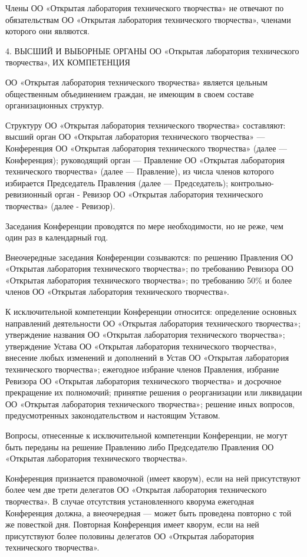\documentclass[a4paper,14pt,titlepage]{extarticle}
\begin{document}
Члены ОО «Открытая лаборатория технического творчества» не отвечают по обязательствам ОО «Открытая лаборатория
технического творчества», членами которого они являются.

4. ВЫСШИЙ И ВЫБОРНЫЕ ОРГАНЫ ОО «Открытая лаборатория технического творчества», ИХ КОМПЕТЕНЦИЯ

ОО «Открытая лаборатория технического творчества» является цельным общественным объединением граждан, не имеющим в своем
составе организационных структур.

Структуру ОО «Открытая лаборатория технического творчества» составляют:
высший орган ОО «Открытая лаборатория технического творчества» — Конференция ОО «Открытая лаборатория технического
творчества» (далее — Конференция);
руководящий орган — Правление ОО «Открытая лаборатория технического творчества» (далее — Правление), из числа членов
которого избирается Председатель Правления (далее — Председатель);
контрольно-ревизионный орган - Ревизор ОО «Открытая лаборатория технического творчества» (далее - Ревизор). 

Заседания Конференции проводятся по мере необходимости, но не реже, чем один раз в календарный год. 

Внеочередные заседания Конференции созываются:
по решению Правления ОО «Открытая лаборатория технического творчества»;
по требованию Ревизора ОО «Открытая лаборатория технического творчества»;
по требованию 50\% и более членов ОО «Открытая лаборатория технического творчества».

К исключительной компетенции Конференции относится:
определение основных направлений деятельности ОО «Открытая лаборатория технического творчества»;
утверждение названия ОО «Открытая лаборатория технического творчества»;
утверждение Устава ОО «Открытая лаборатория технического творчества», внесение любых изменений и дополнений в Устав ОО
«Открытая лаборатория технического творчества»;
ежегодное избрание членов Правления, избрание Ревизора ОО «Открытая лаборатория технического творчества» и досрочное
прекращение их полномочий;
принятие решения о реорганизации или ликвидации ОО «Открытая лаборатория технического творчества»;
решение иных вопросов, предусмотренных законодательством и настоящим Уставом.

Вопросы, отнесенные к исключительной компетенции Конференции, не могут быть переданы на решение Правлению либо
Председателю Правления ОО «Открытая лаборатория технического творчества».

Конференция признается правомочной (имеет кворум), если на ней присутствуют более чем две трети делегатов ОО «Открытая
лаборатория технического творчества». В случае отсутствия установленного кворума ежегодная Конференция должна, а
внеочередная — может быть проведена повторно с той же повесткой дня. Повторная Конференция имеет кворум, если на ней
присутствуют более половины делегатов ОО «Открытая лаборатория технического творчества».
\end{document}
